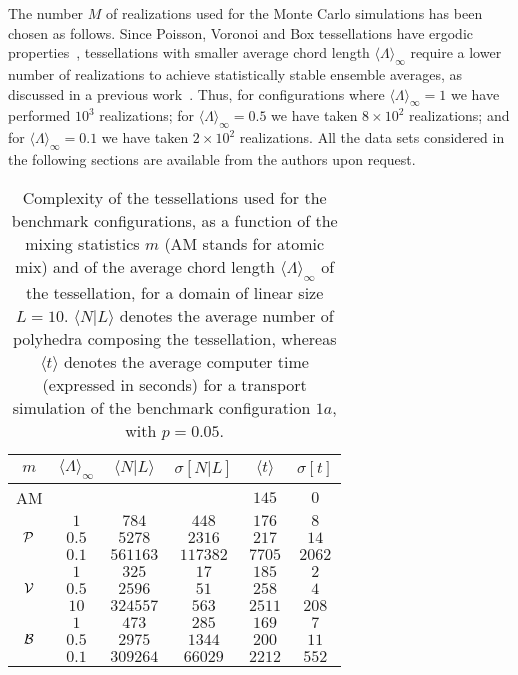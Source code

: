 \documentclass[final,authoryear,5p,times,twocolumn]{elsarticle}
\begin{document}
The number $M$ of realizations used for the Monte Carlo simulations has been chosen as follows. Since Poisson, Voronoi and Box tessellations have ergodic properties~\cite{miles1970, miles1972}, tessellations with smaller average chord length ${\langle \Lambda \rangle}_{\infty}$ require a lower number of realizations to achieve statistically stable ensemble averages, as discussed in a previous work~\cite{larmier_benchmark}. Thus, for configurations where ${\langle \Lambda \rangle}_{\infty}=1$ we have performed $10^3$ realizations; for ${\langle \Lambda \rangle}_{\infty}=0.5$ we have taken $8\times 10^2$ realizations; and for ${\langle \Lambda \rangle}_{\infty}=0.1$ we have taken $2\times 10^2$ realizations. All the data sets considered in the following sections are available from the authors upon request.

\begin{table}
\begin{center}
\begin{tabular}{cccccc}
\toprule
$m$ & ${\langle \Lambda \rangle}_{\infty}$ & $\langle N | L \rangle$ & $\sigma [N | L]$ & $\langle t \rangle$ & $\sigma [t]$\\
\midrule
AM & & & & $145$ & $0$\\ 
\midrule
& $1$ & $784$ & $448$ & $176$ & $8$  \\
${\cal P}$ & $0.5$ & $5278$ & $2316$ & $217$ & $14$ \\
& $0.1$ & $561163$ & $117382$ & $7705$ & $2062$ \\
\midrule
& $1$ & $325$ & $17$ & $185$ & $2$ \\
${\cal V}$ & $0.5$ & $2596$ & $51$ & $258$ & $4$ \\
& $10$ & $324557$ & $563$ & $2511$ & $208$ \\
\midrule
& $1$ & $473$ & $285$ & $169$  & $7$ \\
${\cal B}$ & $0.5$ & $2975$ & $1344$ & $200$ & $11$ \\
& $0.1$ & $309264$ & $66029$ & $2212$ & $552$ \\
\bottomrule
\end{tabular}
\end{center}
\caption{Complexity of the tessellations used for the benchmark configurations, as a function of the mixing statistics $m$ (AM stands for atomic mix) and of the average chord length ${\langle \Lambda \rangle}_{\infty}$ of the tessellation, for a domain of linear size $L=10$. $\langle N | L \rangle$ denotes the average number of polyhedra composing the tessellation, whereas $\langle t \rangle$ denotes the average computer time (expressed in seconds) for a transport simulation of the benchmark configuration $1a$, with $p=0.05$.}
\label{tab_complexity}
\end{table}
\end{document}

